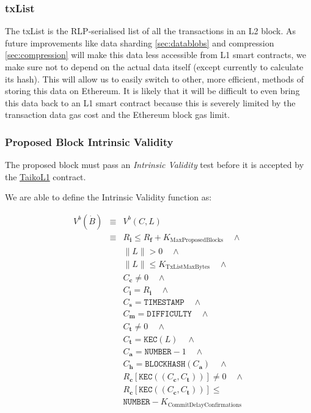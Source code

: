 \documentclass[9pt,oneside]{amsart}
\begin{document}
\begin{multicols}{2}
\subsubsection{txList}\label{sec:txlist}
The txList is the RLP-serialised list of all the transactions in an L2 block. As future improvements like data sharding \ref{sec:datablobs} and compression \ref{sec:compression} will make this data less accessible from L1 smart contracts, we make sure not to depend on the actual data itself (except currently to calculate its hash). This will allow us to easily switch to other, more efficient, methods of storing this data on Ethereum. It is likely that it will be difficult to even bring this data back to an L1 smart contract because this is severely limited by the transaction data gas cost and the Ethereum block gas limit.

\subsubsection{Proposed Block Intrinsic Validity}
The proposed block must pass an \emph{Intrinsic Validity} test before it is accepted by the \underline{TaikoL1} contract. 

We are able to define the Intrinsic Validity function as:

\begin{eqnarray}
V^{b}(\dot{B}) & \equiv &   V^{b}(C,L)  \\
\nonumber & \equiv &   R_\mathbf{i} \le R_\mathbf{f} + K_\mathrm{MaxProposedBlocks}   \quad \wedge \\
\nonumber& & \lVert L \rVert > 0 \quad \wedge \\
\nonumber & & \lVert L \rVert \le K_{\mathrm{TxListMaxBytes}} \quad \wedge \\
\nonumber& & C_{\mathbf{c}} \ne 0   \quad \wedge \\
\nonumber& & C_{\mathbf{i}} = R_\mathbf{i}   \quad \wedge \\
\nonumber& & C_{\mathbf{s}} = \texttt{TIMESTAMP}   \quad \wedge \\
\nonumber& & C_{\mathbf{m}} = \texttt{DIFFICULTY}   \quad \wedge \\
\nonumber& & C_{\mathbf{t}} \ne 0   \quad \wedge \\
\nonumber& & C_{\mathbf{t}} = \texttt{KEC}(L)   \quad \wedge \\
\nonumber& & C_{\mathbf{a}} = \texttt{NUMBER} - 1   \quad \wedge \\
\nonumber& & C_{\mathbf{h}} = \texttt{BLOCKHASH}(C_{\mathbf{a}})   \quad \wedge \\
\nonumber& & R_{\mathbf{c}}[\texttt{KEC}((C_{\mathbf{c}}, C_{\mathbf{t}}))] \ne 0  \quad \wedge \\
\nonumber& & R_{\mathbf{c}}[\texttt{KEC}((C_{\mathbf{c}}, C_{\mathbf{t}}))] \le  \\
\nonumber& &  \texttt{NUMBER}   -  K_{\mathrm{CommitDelayConfirmations}}
\end{eqnarray}


\end{multicols}
\end{document}
